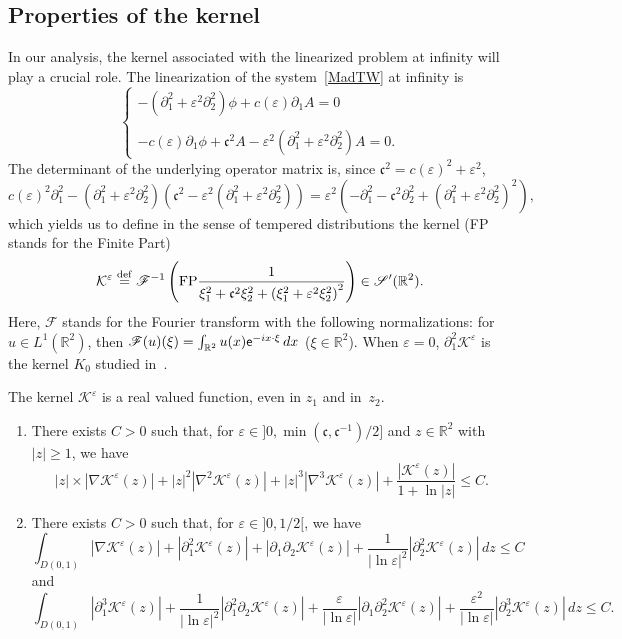 \documentclass[10pt]{amsart}
\theoremstyle{definition}\newtheorem{defi}[theo]{Definition}\newtheorem{rema}[theo]{Remark}\newtheorem{exam}[theo]{Example}\newtheorem{exem}[theo]{Example}\newtheorem{nota}[theo]{Notation}
\newcommand*\p{\partial}
\newcommand*\R{\mathbb R}
\newcommand*\ddef{\stackrel{\rm def}{=}}
\newcommand{\FP}{\mathrm{FP}}
\newcommand*\BK{\mathcal{K}}
\newcommand*\ds{\displaystyle}
\newcommand*\ex{{\sf e}}
\newcommand*\Fou{\mathscr{F}}
\newcommand*\Sch{\mathscr{S}}
\newcommand*\cs{{\mathfrak c}}
\newcommand*\gs{\geqslant }
\newcommand*\ls{\leqslant }
\newcommand*\e{\varepsilon}
\newcommand*\lne{\lvert \ln \varepsilon \rvert}
\newcommand*{\romanenumi}{\renewcommand*{\theenumi}{\roman{enumi}}}
\begin{document}
\subsection{Properties of the kernel}

In our analysis, the kernel associated with the linearized problem at infinity will play a crucial role. The linearization of the system~\eqref{MadTW} at infinity is
\begin{equation*}
\left\{
\begin{array}{ll}
\ds{ - \left(\p_{1}^2 + \e^2 \p^2_{2}\right) \phi + c(\e) \p_{1} A } = 0 \\ \ \\
\ds{ - c(\e) \p_{1} \phi + \cs^2 A - \e^2 \left(\p_{1}^2 + \e^2 \p_{2}^2\right) A = 0.}
\end{array}\right.
\end{equation*}
The determinant of the underlying operator matrix is, since $ \cs^2 = c(\e)^2 + \e^2 $,
\[
c(\e)^2 \p_{1}^2 - \left(\p_{1}^2 + \e^2 \p_{2}^2\right) \left(\cs^2 - \e^2 \left(\p_{1}^2 + \e^2 \p_{2}^2\right) \right) = \e^2 \left(- \p_1^2 - \cs^2 \p_{2}^2 + \left(\p_{1}^2 + \e^2 \p_{2}^2\right)^2 \right),
\]
which yields us to define in the sense of tempered distributions the kernel (FP stands for the Finite Part)
\begin{equation}\label{defkernel}
\BK^\e \ddef \Fou^{-1} \left(
\FP \frac{1}{ \xi_1^2 + \cs^2 \xi_2^2 + \left(\xi_1^2 + \e^2 \xi_2^2\right)^2 } \right)
\in \Sch'(\R^2).
\end{equation}
Here, $ \Fou $ stands for the Fourier transform with the following normalizations: for $ u \in L^1 (\R^2) $, then $ \Fou (u) (\xi) = \int_{\R^2} u(x) \ex^{-i x\cdot \xi } \, dx $ ($\xi \in \R^2 $). When $ \e = 0 $, $ \p_1^2 \BK^\e $ is the kernel $ K_0 $ studied in~\cite{Gravos}.


\begin{prop}\label{noyaux}
The kernel $ \BK^\e $ is a real valued function, even in $z_1 $ and in~$ z_2 $.
\begin{enumerate}\romanenumi
\item\label{prop2.3.1} There exists $ C > 0 $ such that, for $ \e \in]0, \min(\cs,\cs^{-1}) /2] $ and $ z \in \R^2 $ with $ | z | \gs 1 $, we have
\[
|z| \times \left|\nabla \BK^\e (z) \right| + |z|^2 \left|\nabla^2 \BK^\e (z) \right| + |z|^3 \left|\nabla^3 \BK^\e (z)\right| + \frac{\left| \BK^\e (z)\right|}{1 + \ln |z|}
\ls C.
\]
\item\label{prop2.3.2} There exists $ C > 0 $ such that, for $ \e \in] 0,1/2 [$, we have
\[
\int_{D(0,1)} \left\lvert \nabla \BK^\e (z) \right\rvert + \left\lvert \p_1^2 \BK^\e (z) \right\rvert + \left\lvert \p_1\p_2 \BK^\e (z) \right\rvert + \frac{1}{ \lne^2 } \left\lvert \p_2^2 \BK^\e (z) \right\rvert \, dz
\ls C
\]
and
\[
\int_{D(0,1)} \left\lvert \p_1^3 \BK^\e (z) \right\rvert + \frac{1}{ \lne^2} \left\lvert \p_1^2 \p_2 \BK^\e (z) \right\rvert + \frac{\e }{ \lne } \left\lvert \p_1 \p_2^2 \BK^\e (z) \right\rvert + \frac{\e^2}{ \lvert \ln \e \rvert } \left\lvert \p_2^3 \BK^\e (z) \right\rvert \, dz
\ls C.
\]
\end{enumerate}
\end{prop}
\end{document}
